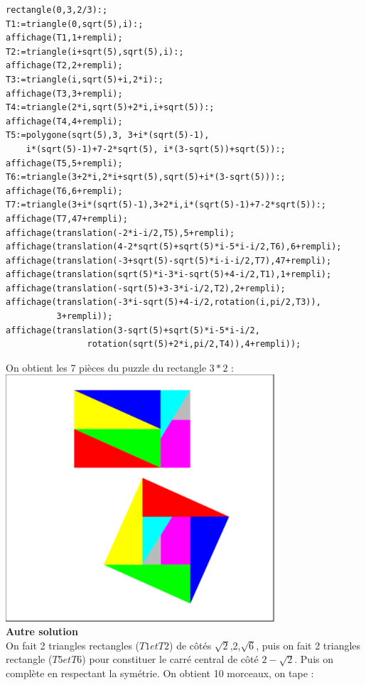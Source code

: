 \documentclass[a4paper,11pt]{book}
\begin{document}
\begin{verbatim}
rectangle(0,3,2/3):;
T1:=triangle(0,sqrt(5),i):;
affichage(T1,1+rempli);
T2:=triangle(i+sqrt(5),sqrt(5),i):;
affichage(T2,2+rempli);
T3:=triangle(i,sqrt(5)+i,2*i):;
affichage(T3,3+rempli);
T4:=triangle(2*i,sqrt(5)+2*i,i+sqrt(5)):;
affichage(T4,4+rempli);
T5:=polygone(sqrt(5),3, 3+i*(sqrt(5)-1), 
    i*(sqrt(5)-1)+7-2*sqrt(5), i*(3-sqrt(5))+sqrt(5)):;
affichage(T5,5+rempli);
T6:=triangle(3+2*i,2*i+sqrt(5),sqrt(5)+i*(3-sqrt(5))):;
affichage(T6,6+rempli);
T7:=triangle(3+i*(sqrt(5)-1),3+2*i,i*(sqrt(5)-1)+7-2*sqrt(5)):;
affichage(T7,47+rempli);
affichage(translation(-2*i-i/2,T5),5+rempli);
affichage(translation(4-2*sqrt(5)+sqrt(5)*i-5*i-i/2,T6),6+rempli);
affichage(translation(-3+sqrt(5)-sqrt(5)*i-i-i/2,T7),47+rempli);
affichage(translation(sqrt(5)*i-3*i-sqrt(5)+4-i/2,T1),1+rempli);
affichage(translation(-sqrt(5)+3-3*i-i/2,T2),2+rempli);
affichage(translation(-3*i-sqrt(5)+4-i/2,rotation(i,pi/2,T3)),
          3+rempli));
affichage(translation(3-sqrt(5)+sqrt(5)*i-5*i-i/2,
                rotation(sqrt(5)+2*i,pi/2,T4)),4+rempli));
\end{verbatim}
On obtient les 7 pi\`eces du puzzle du rectangle $3*2$ :\\
\includegraphics[width=10cm]{carresqrt67}\\
{\bf Autre solution}\\
On fait 2  triangles rectangles ($T1 et T2$) de c\^ot\'es $\sqrt 2$,2,$\sqrt 6$,
 puis on fait 2 triangles rectangle ($T5 et T6$) pour constituer le carr\'e 
central de c\^ot\'e $2-\sqrt 2$. Puis on compl\`ete en respectant la sym\'etrie.
On obtient 10 morceaux, on tape :
\end{document}
